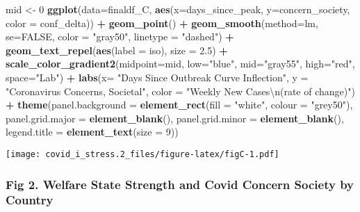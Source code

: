 \documentclass[
]{article}
\newenvironment{Shaded}{\begin{snugshade}}{\end{snugshade}}
\newcommand{\CharTok}[1]{\textcolor[rgb]{0.31,0.60,0.02}{#1}}
\newcommand{\DataTypeTok}[1]{\textcolor[rgb]{0.13,0.29,0.53}{#1}}
\newcommand{\DecValTok}[1]{\textcolor[rgb]{0.00,0.00,0.81}{#1}}
\newcommand{\FloatTok}[1]{\textcolor[rgb]{0.00,0.00,0.81}{#1}}
\newcommand{\KeywordTok}[1]{\textcolor[rgb]{0.13,0.29,0.53}{\textbf{#1}}}
\newcommand{\NormalTok}[1]{#1}
\newcommand{\OperatorTok}[1]{\textcolor[rgb]{0.81,0.36,0.00}{\textbf{#1}}}
\newcommand{\OtherTok}[1]{\textcolor[rgb]{0.56,0.35,0.01}{#1}}
\newcommand{\StringTok}[1]{\textcolor[rgb]{0.31,0.60,0.02}{#1}}
\begin{document}
\begin{Shaded}
\begin{Highlighting}[]
\NormalTok{mid <-}\StringTok{ }\DecValTok{0}
\KeywordTok{ggplot}\NormalTok{(}\DataTypeTok{data=}\NormalTok{finaldf_C, }\KeywordTok{aes}\NormalTok{(}\DataTypeTok{x=}\NormalTok{days_since_peak, }\DataTypeTok{y=}\NormalTok{concern_society, }\DataTypeTok{color =}\NormalTok{ conf_delta)) }\OperatorTok{+}
\StringTok{  }\KeywordTok{geom_point}\NormalTok{() }\OperatorTok{+}
\StringTok{  }\KeywordTok{geom_smooth}\NormalTok{(}\DataTypeTok{method=}\NormalTok{lm, }\DataTypeTok{se=}\OtherTok{FALSE}\NormalTok{, }\DataTypeTok{color =} \StringTok{"gray50"}\NormalTok{, }\DataTypeTok{linetype =} \StringTok{"dashed"}\NormalTok{) }\OperatorTok{+}
\StringTok{  }\KeywordTok{geom_text_repel}\NormalTok{(}\KeywordTok{aes}\NormalTok{(}\DataTypeTok{label =}\NormalTok{ iso), }\DataTypeTok{size =} \FloatTok{2.5}\NormalTok{) }\OperatorTok{+}
\StringTok{  }\KeywordTok{scale_color_gradient2}\NormalTok{(}\DataTypeTok{midpoint=}\NormalTok{mid, }\DataTypeTok{low=}\StringTok{"blue"}\NormalTok{, }\DataTypeTok{mid=}\StringTok{"gray55"}\NormalTok{, }\DataTypeTok{high=}\StringTok{"red"}\NormalTok{, }\DataTypeTok{space=}\StringTok{"Lab"}\NormalTok{) }\OperatorTok{+}
\StringTok{  }\KeywordTok{labs}\NormalTok{(}\DataTypeTok{x=} \StringTok{"Days Since Outbreak Curve Inflection"}\NormalTok{, }\DataTypeTok{y =} \StringTok{"Coronavirus Concerns, Societal"}\NormalTok{, }\DataTypeTok{color =} \StringTok{"Weekly New Cases}\CharTok{\textbackslash{}n}\StringTok{(rate of change)"}\NormalTok{) }\OperatorTok{+}
\StringTok{      }\KeywordTok{theme}\NormalTok{(}\DataTypeTok{panel.background =} \KeywordTok{element_rect}\NormalTok{(}\DataTypeTok{fill =} \StringTok{"white"}\NormalTok{, }\DataTypeTok{colour =} \StringTok{"grey50"}\NormalTok{),}
        \DataTypeTok{panel.grid.major =} \KeywordTok{element_blank}\NormalTok{(),}
        \DataTypeTok{panel.grid.minor =} \KeywordTok{element_blank}\NormalTok{(),}
        \DataTypeTok{legend.title =} \KeywordTok{element_text}\NormalTok{(}\DataTypeTok{size =} \DecValTok{9}\NormalTok{))}
\end{Highlighting}
\end{Shaded}

\texttt{[image: covid\_i\_stress.2\_files/figure-latex/figC-1.pdf]}

\hypertarget{fig-2.-welfare-state-strength-and-covid-concern-society-by-country}{%
\subsubsection{Fig 2. Welfare State Strength and Covid Concern Society
by
Country}\label{fig-2.-welfare-state-strength-and-covid-concern-society-by-country}}
\end{document}
